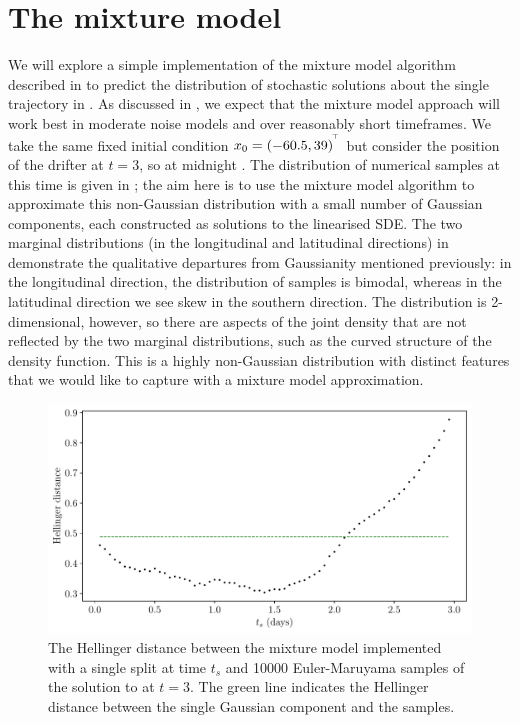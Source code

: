 \section{The mixture model}
We will explore a simple implementation of the mixture model algorithm described in  to predict the distribution of stochastic solutions about the single trajectory in .
As discussed in , we expect that the mixture model approach will work best in moderate noise models and over reasonably short timeframes.
We take the same fixed initial condition \(x_0 = \left(-60.5, 39\right)^{^{\!\top}}\) but consider the position of the drifter at \(t = 3\), so at midnight .
The distribution of numerical samples at this time is given in ; the aim here is to use the mixture model algorithm to approximate this non-Gaussian distribution with a small number of Gaussian components, each constructed as solutions to the linearised SDE.
The two marginal distributions (in the longitudinal and latitudinal directions) in  demonstrate the qualitative departures from Gaussianity mentioned previously: in the longitudinal direction, the distribution of samples is bimodal, whereas in the latitudinal direction we see skew in the southern direction.
The distribution is 2-dimensional, however, so there are aspects of the joint density that are not reflected by the two marginal distributions, such as the curved structure of the density function.
This is a highly non-Gaussian distribution with distinct features that we would like to capture with a mixture model approximation.

\begin{figure}[t]
	\centering
	\includegraphics[width=\textwidth]{chp06_applications/figures/gulf_stream/hell_dist_split}
	\caption{The Hellinger distance between the mixture model implemented with a single split at time \(t_s\) and 10000 Euler-Maruyama samples of the solution to  at \(t = 3\).
		The green line indicates the Hellinger distance between the single Gaussian component and the samples.}
	\label{fig:na_1split_hell}
\end{figure}

